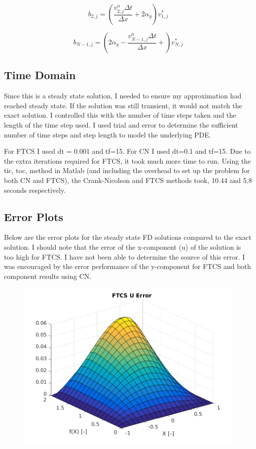 \documentclass[12pt]{article}
\begin{document}
\begin{equation}
b_{2,j} = (\frac{v_{2,j}^n\Delta t}{\Delta x} + 2 \alpha_y)v_{1,j}^*
\end{equation}

\begin{equation}
b_{N-1,j} = ( 2 \alpha_y - \frac{v_{N-1,j}^n\Delta t}{\Delta x} +)v_{N,j}^*
\end{equation}

\subsection{Time Domain}
Since this is a steady state solution, I needed to ensure my approximation had reached steady state. If the solution was still transient, it would not match the exact solution. I controlled this with the number of time steps taken and the length of the time step used. I used trial and error to determine the sufficient number of time steps and step length to model the underlying PDE. 

For FTCS I used dt = 0.001 and tf=15. For CN I used dt=0.1 and tf=15. Due to the extra iterations required for FTCS, it took much more time to run. Using the tic, toc, method in Matlab (and including the overhead to set up the problem for both CN and FTCS), the Crank-Nicolson and FTCS methods took, 10.44 and 5.8 seconds respectively.

\subsection{Error Plots}

Below are the error plots for the steady state FD solutions compared to the exact solution. I should note that the error of the x-component (u) of the solution is too high for FTCS. I have not been able to determine the source of this error. I was encouraged by the error performance of the y-component for FTCS and both component results using CN.

	\begin{figure}[!htb]
		\centering
		\includegraphics[scale=0.75]{ftcsu.png}
	\end{figure}
	
\end{document}
